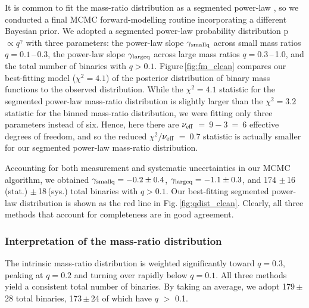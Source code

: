 \documentclass[a4paper,fleqn,usenatbib]{mnras}
\begin{document}
It is common to fit the mass-ratio distribution as a segmented power-law \citep[e.g.][]{moe&distefano2017}, so we conducted a final MCMC forward-modelling routine incorporating a different Bayesian prior. We adopted a segmented power-law probability distribution p $\propto q^{\gamma}$ with three parameters: the power-law slope $\gamma_{\rm smallq}$ across small mass ratios $q = 0.1$\,--\,0.3, the power-law slope $\gamma_{\rm largeq}$ across large mass ratios $q = 0.3$\,--\,1.0, and the total number of binaries with $q>0.1$. Figure\,\ref{fig:fm_clean} compares our best-fitting model ($\chi^2 = 4.1$) of the posterior distribution of binary mass functions to the observed distribution. While the $\chi^2 = 4.1$ statistic for the segmented power-law mass-ratio distribution is slightly larger than the $\chi^2 = 3.2$ statistic for the binned mass-ratio distribution, we were fitting only three parameters instead of six. Hence, here there are $\nu_{\rm eff}$~=~$9-3$~=~6 effective degrees of freedom, and so the reduced  $\chi^2$/$\nu_{\rm eff}$~=~0.7 statistic is actually smaller for our segmented power-law mass-ratio distribution. 

Accounting for both measurement and systematic uncertainties in our MCMC algorithm, we obtained \mbox{$\gamma_{\rm smallq} = -0.2\pm0.4$}, \mbox{$\gamma_{\rm largeq}=-1.1 \pm 0.3$}, and 174 $\pm$\,16\,(stat.) $\pm$\,18\,(sys.) total binaries with $q>0.1$.  Our best-fitting segmented power-law distribution is shown as the red line in Fig.\,\ref{fig:qdist_clean}. Clearly, all three methods that account for completeness are in good agreement.


\subsubsection{Interpretation of the mass-ratio distribution}
\label{sssec:interp}

The intrinsic mass-ratio distribution is weighted significantly toward $q=0.3$, peaking at $q=0.2$ and turning over rapidly below $q=0.1$. All three methods yield a consistent total number of binaries. By taking an average, we adopt 179\,$\pm$\,28 total binaries, 173\,$\pm$\,24 of which have $q$ $>$ 0.1.
\end{document}
